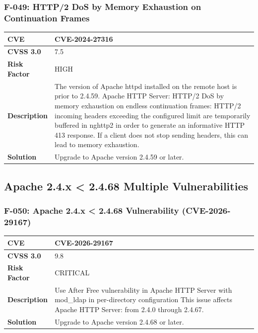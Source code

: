 \subsubsection{F-049: HTTP/2 DoS by Memory Exhaustion on Continuation Frames}
\begin{tabular}{|p{2.8cm}|p{12.2cm}|}
\hline
\textbf{CVE} & CVE-2024-27316 \\ \hline
\textbf{CVSS 3.0} & 7.5 \\ \hline
\textbf{Risk Factor} & HIGH \\ \hline
\textbf{Description} & The version of Apache httpd installed on the remote host is prior to 2.4.59. Apache HTTP Server: HTTP/2 DoS by memory exhaustion on endless continuation frames: HTTP/2 incoming headers exceeding the configured limit are temporarily buffered in nghttp2 in order to generate an informative HTTP 413 response. If a client does not stop sending headers, this can lead to memory exhaustion. \\ \hline
\textbf{Solution} & Upgrade to Apache version 2.4.59 or later. \\ \hline
\end{tabular}

%
%
\subsection{Apache 2.4.x < 2.4.68 Multiple Vulnerabilities}

\subsubsection{F-050: Apache 2.4.x < 2.4.68 Vulnerability (CVE-2026-29167)}
\begin{tabular}{|p{2.8cm}|p{12.2cm}|}
\hline
\textbf{CVE} & CVE-2026-29167 \\ \hline
\textbf{CVSS 3.0} & 9.8 \\ \hline
\textbf{Risk Factor} & CRITICAL \\ \hline
\textbf{Description} & Use After Free vulnerability in Apache HTTP Server with mod\_ldap in per-directory configuration This issue affects Apache HTTP Server: from 2.4.0 through 2.4.67. \\ \hline
\textbf{Solution} & Upgrade to Apache version 2.4.68 or later. \\ \hline
\end{tabular}

